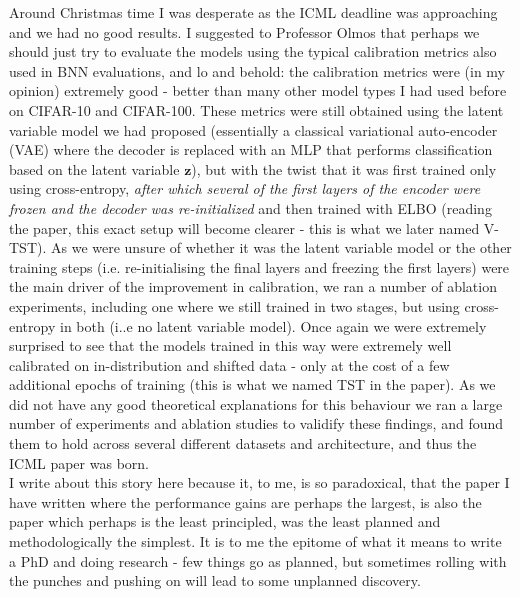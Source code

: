 \noindent Around Christmas time I was desperate as the ICML deadline was approaching and we had no good results. I suggested to Professor Olmos that perhaps we should just try to evaluate the models using the typical calibration metrics also used in BNN evaluations, and lo and behold: the calibration metrics were (in my opinion) extremely good - better than many other model types I had used before on CIFAR-10 and CIFAR-100. These metrics were still obtained using the latent variable model we had proposed (essentially a classical variational auto-encoder (VAE) \citep{kingma2014vae} where the decoder is replaced with an MLP that performs classification based on the latent variable $\mathbf{z}$), but with the twist that it was first trained only using cross-entropy, \textit{after which several of the first layers of the encoder were frozen and the decoder was re-initialized} and then trained with ELBO (reading the paper, this exact setup will become clearer - this is what we later named V-TST). As we were unsure of whether it was the latent variable model or the other training steps (i.e. re-initialising the final layers and freezing the first layers) were the main driver of the improvement in calibration, we ran a number of ablation experiments, including one where we still trained in two stages, but using cross-entropy in both (i..e no latent variable model). Once again we were extremely surprised to see that the models trained in this way were extremely well calibrated on in-distribution and shifted data - only at the cost of a few additional epochs of training (this is what we named TST in the paper). As we did not have any good theoretical explanations for this behaviour we ran a large number of experiments and ablation studies to validify these findings, and found them to hold across several different datasets and architecture, and thus the ICML paper was born. \\

\noindent I write about this story here because it, to me, is so paradoxical, that the paper I have written where the performance gains are perhaps the largest, is also the paper which perhaps is the least principled, was the least planned and methodologically the simplest. It is to me the epitome of what it means to write a PhD and doing research - few things go as planned, but sometimes rolling with the punches and pushing on will lead to some unplanned discovery. \\

